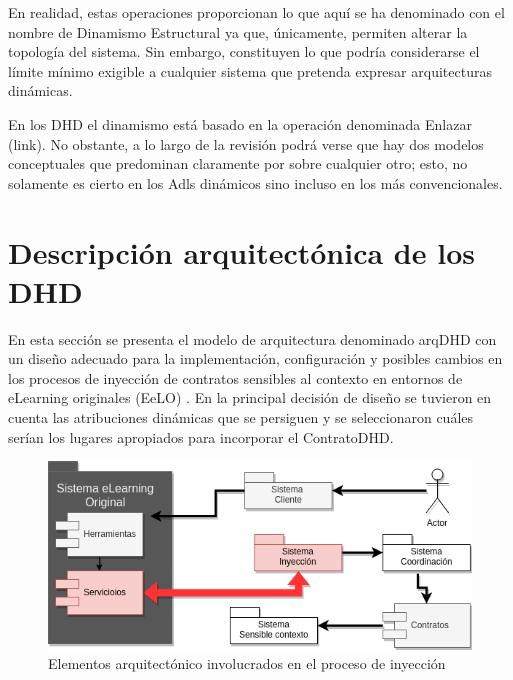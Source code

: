 En realidad, estas operaciones proporcionan lo que aquí se ha denominado con el nombre de Dinamismo Estructural ya que, únicamente, permiten alterar la topología
del sistema. Sin embargo, constituyen lo que podría considerarse el límite
mínimo exigible a cualquier sistema que pretenda expresar arquitecturas
dinámicas. 

En los DHD el dinamismo está basado en la operación denominada Enlazar
(link). No obstante, a lo largo de la revisión podrá verse que hay dos
modelos conceptuales que predominan claramente por sobre cualquier otro; esto, no solamente es
cierto en los Adls dinámicos sino incluso en los más convencionales. 



\section{Descripción arquitectónica de los DHD} \label{secc:arqDHD}



En esta sección se presenta el modelo de arquitectura denominado arqDHD con un diseño adecuado para la implementación, configuración y posibles cambios en los procesos de inyección de contratos sensibles al contexto en entornos de eLearning originales (EeLO) \label{EeLO}. En la principal decisión de diseño se tuvieron en cuenta las atribuciones dinámicas que se persiguen y se seleccionaron cuáles serían los lugares apropiados para incorporar el ContratoDHD. 


\begin{figure}
\begin{center}
 \includegraphics[scale=0.55]{Ch2/ArqDHD2.png}
\caption{Elementos arquitectónico involucrados en el proceso de inyección} \label{fig:arqDHD1}
\end{center}
\end{figure} 


